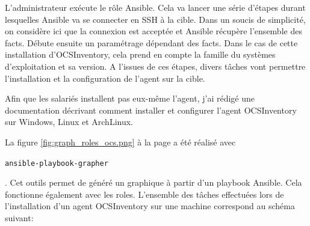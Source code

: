 \documentclass[12pt, a4paper, twoside]{article}
\begin{document}
L'administrateur exécute le rôle \gls{Ansible}.
Cela va lancer une série d'étapes durant lesquelles \gls{Ansible} va se connecter en SSH à la cible.
Dans un soucis de simplicité, on considère ici que la connexion est acceptée et \gls{Ansible} récupère l'ensemble des facts.
Débute ensuite un paramétrage dépendant des facts. 
Dans le cas de cette installation d'\gls{OCSInventory}, cela prend en compte la famille du systèmes d'exploitation et sa version.
A l'issues de ces étapes, divers tâches vont permettre l'installation et la configuration de l'agent sur la cible.

Afin que les salariés installent pas eux-même l'agent, j'ai rédigé une documentation décrivant comment installer et configurer l'agent \gls{OCSInventory} sur Windows, \gls{Linux} et ArchLinux.

La figure \ref{fig:graph_roles_ocs.png} à la page \pageref{fig:graph_roles_ocs.png} a été réalisé avec \begin{code}\texttt{ansible-playbook-grapher}\end{code}.
Cet outils permet de généré un graphique à partir d'un playbook \gls{Ansible}.
Cela fonctionne également avec les roles.
L'ensemble des tâches effectuées lors de l'installation d'un agent \gls{OCSInventory} sur une machine correspond au schéma suivant:
\end{document}

